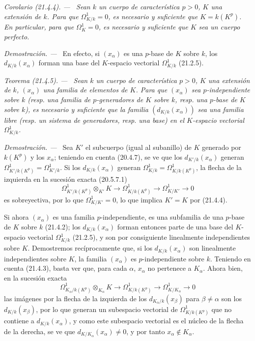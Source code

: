 \documentclass[10pt,oneside]{book}
\makeatletter
\newcommand{\setmanualcurrentlabel}[1]{\def\@currentlabel{#1}}
\newcommand{\oldpage}[2][]{%
  \setcounter{footnote}{0}%
  \marginpar{\scriptsize\textbf{#1}~|~#2}\ignorespaces}
\newenvironment{theorem}[1][]{%
  \setmanualcurrentlabel{#1}\par\medskip\noindent\itshape Teorema (#1). ---\ }{\par}
\newenvironment{corollary}[1][]{%
  \setmanualcurrentlabel{#1}\par\medskip\noindent\itshape Corolario (#1). ---\ }{\par}
\newenvironment{proof}{%
  \par\medskip\noindent\textit{Demostración. ---\ }}{\par}
\makeatother
\begin{document}
\oldpage[0\textsubscript{IV-1}]{163}
\begin{corollary}[21.4.4]
\label{0.21.4.4-es}
Sean $k$ un cuerpo de característica $p>0$, $K$ una extensión de $k$.
Para que $\Omega^1_{K/k}=0$, es necesario y suficiente que $K=k(K^p)$.
En particular, para que $\Omega^1_K=0$, es necesario y suficiente que $K$ sea
un cuerpo perfecto.
\end{corollary}

\begin{proof}
En efecto, si $(x_\alpha)$ es una $p$-base de $K$ sobre $k$, los
$d_{K/k}(x_\alpha)$ forman una base del $K$-espacio vectorial $\Omega^1_{K/k}$
(21.2.5).
\end{proof}

\begin{theorem}[21.4.5]
\label{0.21.4.5-es}
Sean $k$ un cuerpo de característica $p>0$, $K$ una extensión de $k$,
$(x_\alpha)$ una familia de elementos de $K$. Para que $(x_\alpha)$ sea
$p$-independiente sobre $k$ (\textup{resp.} una familia de $p$-generadores de $K$ sobre $k$,
\textup{resp.} una $p$-base de $K$ sobre $k$), es necesario y suficiente que la familia
$(d_{K/k}(x_\alpha))$ sea una familia libre (\textup{resp.} un sistema de
generadores, \textup{resp.} una base) en el $K$-espacio vectorial $\Omega^1_{K/k}$.
\end{theorem}

\begin{proof}
\oldpage[0\textsubscript{IV-1}]{164}
Sea $K'$ el subcuerpo (igual al subanillo) de $K$ generado por
$k(K^p)$ y los $x_\alpha$; teniendo en cuenta (20.4.7), se ve que los
$d_{K'/k}(x_\alpha)$ generan $\Omega^1_{K'/k(K^p)}=\Omega^1_{K'/k}$. Si los
$d_{K/k}(x_\alpha)$ generan $\Omega^1_{K/k}=\Omega^1_{K/k(K^p)}$, la flecha de
la izquierda en la sucesión exacta (20.5.7.1)
\[
\Omega^1_{K'/k(K^p)}\otimes_{K'}K\to\Omega^1_{K/k(K^p)}\to\Omega^1_{K/K'}\to0
\]
es sobreyectiva, por lo que $\Omega^1_{K/K'}=0$, lo que implica $K'=K$ por (21.4.4).

Si ahora $(x_\alpha)$ es una familia $p$-independiente, es una subfamilia
de una $p$-base de $K$ sobre $k$ (21.4.2); los $d_{K/k}(x_\alpha)$ forman entonces
parte de una base del $K$-espacio vectorial $\Omega^1_{K/k}$ (21.2.5), y son
por consiguiente linealmente independientes sobre $K$. Demostremos recíprocamente que, si los
$d_{K/k}(x_\alpha)$ son linealmente independientes sobre $K$, la familia
$(x_\alpha)$ es $p$-independiente sobre $k$.
Teniendo en cuenta (21.4.3), basta ver que,
para cada $\alpha$, $x_\alpha$ no pertenece a $K_\alpha$. Ahora bien, en la
sucesión exacta
\[
\Omega^1_{K_\alpha/k(K^p)}\otimes_{K_\alpha}K\longrightarrow
\Omega^1_{K/k(K^p)}\longrightarrow\Omega^1_{K/K_\alpha}\longrightarrow0
\]
las imágenes por la flecha de la izquierda de los $d_{K_\alpha/k}(x_\beta)$ para
$\beta\neq\alpha$ son los $d_{K/k}(x_\beta)$, por lo que generan un subespacio
vectorial de $\Omega^1_{K/k(K^p)}$ que no contiene a $d_{K/k}(x_\alpha)$, y como
este subespacio vectorial es el núcleo de la flecha de la derecha, se ve que
$d_{K/K_\alpha}(x_\alpha)\neq0$, y por tanto $x_\alpha\notin K_\alpha$.
\end{proof}
\end{document}
